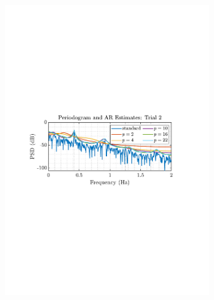 \documentclass[12pt]{article}
\begin{document}
\begin{figure}[H]
\begin{subfigure}{0.49\textwidth}
				\includegraphics[trim={2.2cm 11.2cm 3.15cm  11.2cm}, clip, width=\textwidth]{../MATLAB/figures/q1_5c_fig02.pdf} 
				\caption{}
			\end{subfigure}%
			

\end{figure}
\end{document}
